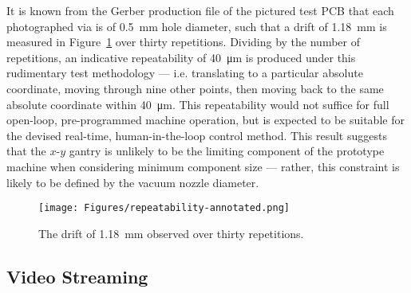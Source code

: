\documentclass[12pt,british,UKenglish]{article}
\begin{document}
It is known from the Gerber production file of the pictured test \ac{PCB} that each photographed via is of \qty{0.5}{\milli\metre} hole diameter, such that a drift of \qty{1.18}{\milli\metre} is measured in Figure~\ref{fig:repeatability-annotated} over thirty repetitions.
Dividing by the number of repetitions, an indicative repeatability of \qty{40}{\micro\metre} is produced under this rudimentary test methodology --- i.e. translating to a particular absolute coordinate, moving through nine other points, then moving back to the same absolute coordinate within \qty{40}{\micro\metre}.
This repeatability would not suffice for full open-loop, pre-programmed machine operation, but is expected to be suitable for the devised real-time, human-in-the-loop control method.
This result suggests that the $x$-$y$ gantry is unlikely to be the limiting component of the prototype machine when considering minimum component size --- rather, this constraint is likely to be defined by the vacuum nozzle diameter.
\begin{figure}[hbtp]
    \texttt{[image: Figures/repeatability-annotated.png]}
    \centering
    \caption{The drift of \qty{1.18}{\milli\metre} observed over thirty repetitions.}
    \label{fig:repeatability-annotated}
\end{figure}



\subsection{Video Streaming}
\end{document}
